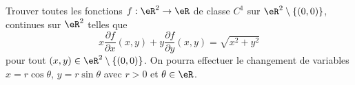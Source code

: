 \begin{exercice}\label{exoCalculDifferentiel0011}

	Trouver toutes les fonctions $f:\eR^2\to\eR$ de classe $C^1$ sur $\eR^2\setminus\{ (0,0) \}$, continues sur $\eR^2$ telles que 
	\begin{equation}		\label{EqeCDuueqares}
 	x\frac{\partial f}{\partial x}(x,y) + y\frac{\partial f}{\partial y}(x,y) = \sqrt{x^2 + y^2}
 \end{equation}
 pour tout $(x,y)\in\eR^2\setminus\{ (0,0) \}$. On pourra effectuer le changement de variables $x= r\cos\theta $, $y= r\sin\theta$ avec $r>0$ et $\theta\in\eR$.


\end{exercice}
